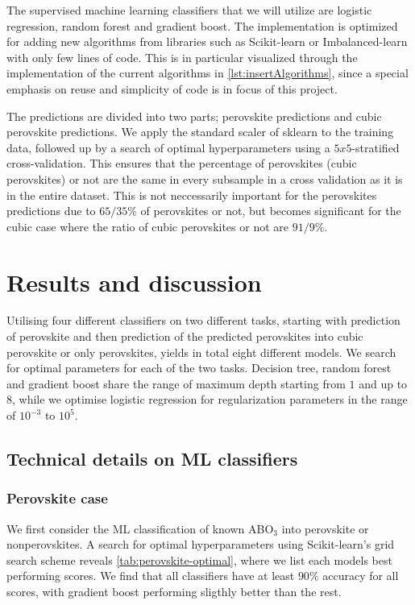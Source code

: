 The supervised machine learning classifiers that we will utilize are logistic regression, random forest and gradient boost. The implementation is optimized for adding new algorithms from libraries such as Scikit-learn \cite{Pedregosa2012} or Imbalanced-learn \cite{Lemaitre2016} with only few lines of code. This is in particular visualized through the implementation of the current algorithms in \autoref{lst:insertAlgorithms}, since a special emphasis on reuse and simplicity of code is in focus of this project.

The predictions are divided into two parts; perovskite predictions and cubic perovskite predictions. We apply the standard scaler of sklearn \cite{Pedregosa2012} to the training data, followed up by a search of optimal hyperparameters using a $5x5$-stratified cross-validation. This ensures that the percentage of perovskites (cubic perovskites) or not are the same in every subsample in a cross validation as it is in the entire dataset. This is not neccessarily important for the perovskites predictions due to $65/35 \%$ of perovskites or not, but becomes significant for the cubic case where the ratio of cubic perovskites or not are $91/9\%$.

\section{Results and discussion}

Utilising four different classifiers on two different tasks, starting with prediction of perovskite and then prediction of the predicted perovskites into cubic perovskite or only perovskites, yields in total eight different models. We search for optimal parameters for each of the two tasks. Decision tree, random forest and gradient boost share the range of maximum depth starting from $1$ and up to $8$, while we optimise logistic regression for regularization parameters in the range of $10^{-3}$ to $10^5$.

\subsection{Technical details on ML classifiers}

\subsubsection{Perovskite case}
We first consider the ML classification of known ABO$_3$ into perovskite or nonperovskites. A search for optimal hyperparameters using Scikit-learn's grid search scheme \cite{Pedregosa2012} reveals \autoref{tab:perovskite-optimal}, where we list each models best performing scores. We find that all classifiers have at least $90\%$ accuracy for all scores, with gradient boost performing sligthly better than the rest.

